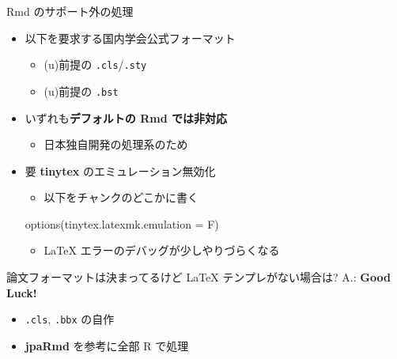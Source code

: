 \documentclass[
  ignorenonframetext,
]{beamer}
\newenvironment{Shaded}{\begin{snugshade}}{\end{snugshade}}
\newcommand{\AttributeTok}[1]{\textcolor[rgb]{0.77,0.63,0.00}{#1}}
\newcommand{\FunctionTok}[1]{\textcolor[rgb]{0.00,0.00,0.00}{#1}}
\newcommand{\NormalTok}[1]{#1}
\providecommand{\tightlist}{%
  \setlength{\itemsep}{0pt}\setlength{\parskip}{0pt}}
\begin{document}
\begin{frame}[fragile]{Rmd のサポート外の処理}
\protect\hypertarget{rmd-ux306eux30b5ux30ddux30fcux30c8ux5916ux306eux51e6ux7406}{}
\begin{itemize}
\item
  以下を要求する国内学会公式フォーマット

  \begin{itemize}
  \tightlist
  \item
    (u)\pLaTeX 前提の \texttt{.cls}/\texttt{.sty}
  \item
    (u)\pBibTeX 前提の \texttt{.bst}
  \end{itemize}
\item
  いずれも\textbf{デフォルトの Rmd では非対応}

  \begin{itemize}
  \tightlist
  \item
    日本独自開発の処理系のため
  \end{itemize}
\item
  要 \textbf{tinytex} のエミュレーション無効化

  \begin{itemize}
  \tightlist
  \item
    以下をチャンクのどこかに書く
  \end{itemize}

\begin{Shaded}
\begin{Highlighting}[]
\FunctionTok{options}\NormalTok{(}\AttributeTok{tinytex.latexmk.emulation =}\NormalTok{ F)}
\end{Highlighting}
\end{Shaded}

  \begin{itemize}
  \tightlist
  \item
    LaTeX エラーのデバッグが少しやりづらくなる
  \end{itemize}
\end{itemize}
\end{frame}

\begin{frame}[fragile]{論文フォーマットは決まってるけど LaTeX テンプレがない場合は?}
\protect\hypertarget{ux8ad6ux6587ux30d5ux30a9ux30fcux30deux30c3ux30c8ux306fux6c7aux307eux3063ux3066ux308bux3051ux3069-latex-ux30c6ux30f3ux30d7ux30ecux304cux306aux3044ux5834ux5408ux306f}{}
A.: \textbf{Good Luck!}

\begin{itemize}
\tightlist
\item
  \texttt{.cls}, \texttt{.bbx} の自作
\item
  \textbf{jpaRmd} を参考に全部 R で処理
\end{itemize}
\end{frame}
\end{document}
